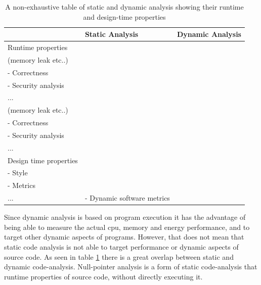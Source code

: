\documentclass{report}
\begin{document}
\begin{table}[h!]
\centering
\begin{tabularx}{\textwidth}{|X|X|X|}
\hline
                                & Static Analysis                                                                                        & Dynamic Analysis                                                                                       \\ \hline
Runtime properties     & \begin{tabular}[c]{@{}l@{}}- Performance \\(memory leak etc..)\\ - Correctness\\ - Security analysis\\ ...\end{tabular} & \begin{tabular}[c]{@{}l@{}}- Performance \\(memory leak etc..)\\ - Correctness\\ - Security analysis\\ ...\end{tabular} \\ \hline
Design time properties & \begin{tabular}[c]{@{}l@{}}- Design principles \\ - Style\\ - Metrics\\ ...\end{tabular}                              & - Dynamic software metrics                                                                                            \\ \hline
\end{tabularx}
\caption{A non-exhaustive table of static and dynamic analysis showing their runtime and design-time properties}
\label{table:static-dynamic}
\end{table}

Since dynamic analysis is based on program execution it has the advantage of being able to measure the actual \gls{cpu}, memory and energy performance, and to target other dynamic aspects of programs. However, that does not mean that static code analysis is not able to target performance or dynamic aspects of source code. As seen in table \ref{table:static-dynamic} there is a great overlap between static and dynamic code-analysis. Null-pointer analysis is a form of static code-analysis that runtime properties of source code, without directly executing it.
\end{document}
